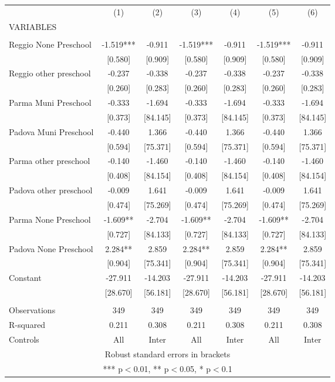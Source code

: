 \begin{tabular}{lcccccc} \hline
 & (1) & (2) & (3) & (4) & (5) & (6) \\
VARIABLES &  &  &  &  &  &  \\ \hline
 &  &  &  &  &  &  \\
Reggio None Preschool & -1.519*** & -0.911 & -1.519*** & -0.911 & -1.519*** & -0.911 \\
 & [0.580] & [0.909] & [0.580] & [0.909] & [0.580] & [0.909] \\
Reggio other preschool & -0.237 & -0.338 & -0.237 & -0.338 & -0.237 & -0.338 \\
 & [0.260] & [0.283] & [0.260] & [0.283] & [0.260] & [0.283] \\
Parma Muni Preschool & -0.333 & -1.694 & -0.333 & -1.694 & -0.333 & -1.694 \\
 & [0.373] & [84.145] & [0.373] & [84.145] & [0.373] & [84.145] \\
Padova Muni Preschool & -0.440 & 1.366 & -0.440 & 1.366 & -0.440 & 1.366 \\
 & [0.594] & [75.371] & [0.594] & [75.371] & [0.594] & [75.371] \\
Parma other preschool & -0.140 & -1.460 & -0.140 & -1.460 & -0.140 & -1.460 \\
 & [0.408] & [84.154] & [0.408] & [84.154] & [0.408] & [84.154] \\
Padova other preschool & -0.009 & 1.641 & -0.009 & 1.641 & -0.009 & 1.641 \\
 & [0.474] & [75.269] & [0.474] & [75.269] & [0.474] & [75.269] \\
Parma None Preschool & -1.609** & -2.704 & -1.609** & -2.704 & -1.609** & -2.704 \\
 & [0.727] & [84.133] & [0.727] & [84.133] & [0.727] & [84.133] \\
Padova None Preschool & 2.284** & 2.859 & 2.284** & 2.859 & 2.284** & 2.859 \\
 & [0.904] & [75.341] & [0.904] & [75.341] & [0.904] & [75.341] \\
Constant & -27.911 & -14.203 & -27.911 & -14.203 & -27.911 & -14.203 \\
 & [28.670] & [56.181] & [28.670] & [56.181] & [28.670] & [56.181] \\
 &  &  &  &  &  &  \\
Observations & 349 & 349 & 349 & 349 & 349 & 349 \\
R-squared & 0.211 & 0.308 & 0.211 & 0.308 & 0.211 & 0.308 \\
 Controls & All & Inter & All & Inter & All & Inter \\ \hline
\multicolumn{7}{c}{ Robust standard errors in brackets} \\
\multicolumn{7}{c}{ *** p$<$0.01, ** p$<$0.05, * p$<$0.1} \\
\end{tabular}
